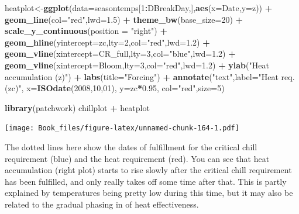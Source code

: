 \documentclass[
]{book}
\newenvironment{Shaded}{\begin{snugshade}}{\end{snugshade}}
\newcommand{\DataTypeTok}[1]{\textcolor[rgb]{0.13,0.29,0.53}{#1}}
\newcommand{\DecValTok}[1]{\textcolor[rgb]{0.00,0.00,0.81}{#1}}
\newcommand{\FloatTok}[1]{\textcolor[rgb]{0.00,0.00,0.81}{#1}}
\newcommand{\KeywordTok}[1]{\textcolor[rgb]{0.13,0.29,0.53}{\textbf{#1}}}
\newcommand{\NormalTok}[1]{#1}
\newcommand{\OperatorTok}[1]{\textcolor[rgb]{0.81,0.36,0.00}{\textbf{#1}}}
\newcommand{\StringTok}[1]{\textcolor[rgb]{0.31,0.60,0.02}{#1}}
\begin{document}
\begin{Shaded}
\begin{Highlighting}[]
\NormalTok{heatplot<-}\KeywordTok{ggplot}\NormalTok{(}\DataTypeTok{data=}\NormalTok{seasontemps[}\DecValTok{1}\OperatorTok{:}\NormalTok{DBreakDay,],}\KeywordTok{aes}\NormalTok{(}\DataTypeTok{x=}\NormalTok{Date,}\DataTypeTok{y=}\NormalTok{z)) }\OperatorTok{+}
\StringTok{  }\KeywordTok{geom_line}\NormalTok{(}\DataTypeTok{col=}\StringTok{"red"}\NormalTok{,}\DataTypeTok{lwd=}\FloatTok{1.5}\NormalTok{) }\OperatorTok{+}
\StringTok{  }\KeywordTok{theme_bw}\NormalTok{(}\DataTypeTok{base_size=}\DecValTok{20}\NormalTok{) }\OperatorTok{+}
\StringTok{  }\KeywordTok{scale_y_continuous}\NormalTok{(}\DataTypeTok{position =} \StringTok{"right"}\NormalTok{) }\OperatorTok{+}
\StringTok{  }\KeywordTok{geom_hline}\NormalTok{(}\DataTypeTok{yintercept=}\NormalTok{zc,}\DataTypeTok{lty=}\DecValTok{2}\NormalTok{,}\DataTypeTok{col=}\StringTok{"red"}\NormalTok{,}\DataTypeTok{lwd=}\FloatTok{1.2}\NormalTok{) }\OperatorTok{+}
\StringTok{  }\KeywordTok{geom_vline}\NormalTok{(}\DataTypeTok{xintercept=}\NormalTok{CR_full,}\DataTypeTok{lty=}\DecValTok{3}\NormalTok{,}\DataTypeTok{col=}\StringTok{"blue"}\NormalTok{,}\DataTypeTok{lwd=}\FloatTok{1.2}\NormalTok{) }\OperatorTok{+}
\StringTok{  }\KeywordTok{geom_vline}\NormalTok{(}\DataTypeTok{xintercept=}\NormalTok{Bloom,}\DataTypeTok{lty=}\DecValTok{3}\NormalTok{,}\DataTypeTok{col=}\StringTok{"red"}\NormalTok{,}\DataTypeTok{lwd=}\FloatTok{1.2}\NormalTok{) }\OperatorTok{+}
\StringTok{  }\KeywordTok{ylab}\NormalTok{(}\StringTok{"Heat accumulation (z)"}\NormalTok{) }\OperatorTok{+}
\StringTok{  }\KeywordTok{labs}\NormalTok{(}\DataTypeTok{title=}\StringTok{"Forcing"}\NormalTok{)  }\OperatorTok{+}
\StringTok{  }\KeywordTok{annotate}\NormalTok{(}\StringTok{"text"}\NormalTok{,}\DataTypeTok{label=}\StringTok{"Heat req. (zc)"}\NormalTok{, }
            \DataTypeTok{x=}\KeywordTok{ISOdate}\NormalTok{(}\DecValTok{2008}\NormalTok{,}\DecValTok{10}\NormalTok{,}\DecValTok{01}\NormalTok{),}
            \DataTypeTok{y=}\NormalTok{zc}\OperatorTok{*}\FloatTok{0.95}\NormalTok{, }\DataTypeTok{col=}\StringTok{"red"}\NormalTok{,}\DataTypeTok{size=}\DecValTok{5}\NormalTok{)}


\KeywordTok{library}\NormalTok{(patchwork)}
\NormalTok{chillplot }\OperatorTok{+}\StringTok{ }\NormalTok{heatplot}
\end{Highlighting}
\end{Shaded}

\texttt{[image: Book\_files/figure-latex/unnamed-chunk-164-1.pdf]}

The dotted lines here show the dates of fulfillment for the critical chill requirement (blue) and the heat requirement (red). You can see that heat accumulation (right plot) starts to rise slowly after the critical chill requirement has been fulfilled, and only really takes off some time after that. This is partly explained by temperatures being pretty low during this time, but it may also be related to the gradual phasing in of heat effectiveness.
\end{document}
